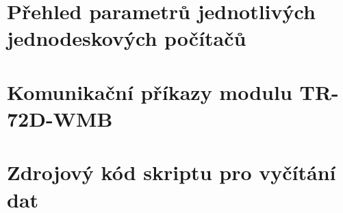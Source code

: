 \chapter{Přehled parametrů jednotlivých jednodeskových počítačů}

\chapter{Komunikační příkazy modulu TR-72D-WMB}

\chapter{Zdrojový kód skriptu pro vyčítání dat}
\label{PrilohaSkript}


